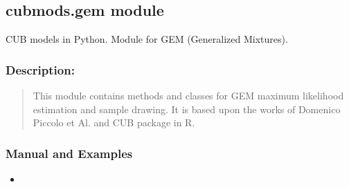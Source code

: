 \documentclass[letterpaper,10pt,english]{sphinxmanual}
\begin{document}
\subsection{cubmods.gem module}
\label{\detokenize{cubmods:module-cubmods.gem}}\label{\detokenize{cubmods:cubmods-gem-module}}\label{\detokenize{cubmods:gem-module}}
\sphinxAtStartPar
CUB models in Python.
Module for GEM (Generalized Mixtures).


\subsubsection{Description:}
\label{\detokenize{cubmods:id634}}\begin{quote}

\sphinxAtStartPar
This module contains methods and classes
for GEM maximum likelihood estimation
and sample drawing.
It is based upon the works of Domenico
Piccolo et Al. and CUB package in R.
\end{quote}


\subsubsection{Manual and Examples}
\label{\detokenize{cubmods:id635}}\begin{itemize}
\item {} 
\sphinxAtStartPar
{}

\end{itemize}
\end{document}
